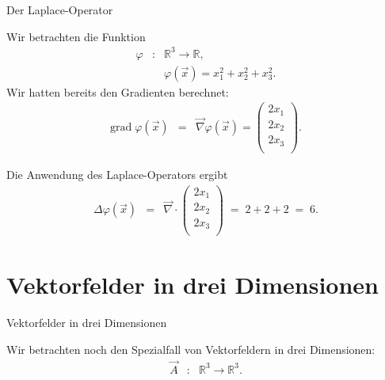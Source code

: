 \documentclass[german]{beamer}
\newcommand{\bq}{\begin{eqnarray*}}
\newcommand{\eq}{\end{eqnarray*}}
\begin{document}
\begin{frame}{Der Laplace-Operator}

\begin{example}
Wir betrachten die Funktion
\bq
 \varphi & : & {\mathbb R}^3 \rightarrow {\mathbb R},
 \nonumber \\
 & & \varphi\left(\vec{x}\right) = x_1^2 + x_2^2 + x_3^2.
\eq
Wir hatten bereits den Gradienten berechnet:
{\footnotesize
\bq
 \mbox{grad}\; \varphi\left(\vec{x}\right)
 & = & \vec{\nabla} \varphi\left(\vec{x}\right)
 =
 \left( \begin{array}{c}
  2 x_1 \\ 2 x_2 \\ 2 x_3 \\
 \end{array} \right).
\eq
}

\vspace*{-3mm}
Die Anwendung des Laplace-Operators ergibt
\bq
 \Delta \varphi\left(\vec{x}\right)
 & = &
 \vec{\nabla} \cdot  
 \left( \begin{array}{c}
  2 x_1 \\ 2 x_2 \\ 2 x_3 \\
 \end{array} \right)
 \; = \;
 2 + 2 + 2 \; = \; 6.
\eq

\end{example}

\end{frame}


\section{Vektorfelder in drei Dimensionen}

\frame{\sectionpage}

\begin{frame}{Vektorfelder in drei Dimensionen}

Wir betrachten noch den Spezialfall von Vektorfeldern in drei Dimensionen:
\bq
 \vec{A} & : & {\mathbb R}^3 \rightarrow {\mathbb R}^3.
\eq

\end{frame}
\end{document}
